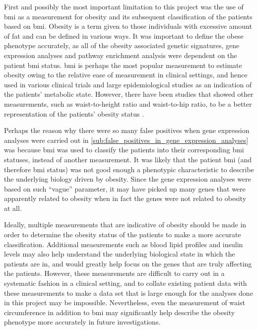 First and possibly the most important limitation to this project was the use of \gls{bmi} as a measurement for obesity and its subsequent classification of the patients based on \gls{bmi}.
Obesity is a term given to those individuals with excessive amount of fat and can be defined in various ways.
It was important to define the obese phenotype accurately, as all of the obesity associated genetic signatures, gene expression analyses and pathway enrichment analysis were dependent on the patient \gls{bmi} status.
\Gls{bmi} is perhaps the most popular measurement to estimate obesity owing to the relative ease of measurement in clinical settings, and hence used in various clinical trials and large epidemiological studies as an indication of the patients' metabolic state.
However, there have been studies that showed other measurements, such as waist-to-height ratio and waist-to-hip ratio, to be a better representation of the patients' obesity status \citep{Dalton2003,Lee2008}.

Perhaps the reason why there were so many false positives when gene expression analyses were carried out in \cref{sub:false_positives_in_gene_expression_analyses} was because \gls{bmi} was used to classify the patients into their corresponding \gls{bmi} statuses, instead of another measurement.
It was likely that the patient \gls{bmi} (and therefore \gls{bmi} status) was not good enough a phenotypic characteristic to describe the underlying biology driven by obesity.
Since the gene expression analyses were based on such ``vague'' parameter, it may have picked up many genes that were apparently related to obesity when in fact the genes were not related to obesity at all.

Ideally, multiple measurements that are indicative of obesity should be made in order to determine the obesity status of the patients to make a more accurate classification.
Additional measurements such as blood lipid profiles and insulin levels may also help understand the underlying biological state in which the patients are in, and would greatly help focus on the genes that are truly affecting the patients.
However, these measurements are difficult to carry out in a systematic fashion in a clinical setting, and to collate existing patient data with these measurements to make a data set that is large enough for the analyses done in this project may be impossible.
Nevertheless, even the measurement of waist circumference in addition to \gls{bmi} may significantly help describe the obesity phenotype more accurately in future investigations.

